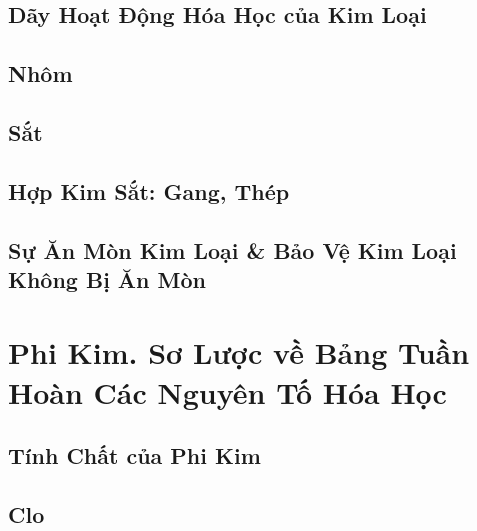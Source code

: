 \documentclass{article}
\numberwithin{equation}{section}
\begin{document}

\subsection{Dãy Hoạt Động Hóa Học của Kim Loại}


\subsection{Nhôm}


\subsection{Sắt}


\subsection{Hợp Kim Sắt: Gang, Thép}


\subsection{Sự Ăn Mòn Kim Loại \& Bảo Vệ Kim Loại Không Bị Ăn Mòn}


\section{Phi Kim. Sơ Lược về Bảng Tuần Hoàn Các Nguyên Tố Hóa Học}

\subsection{Tính Chất của Phi Kim}


\subsection{Clo}
\end{document}
